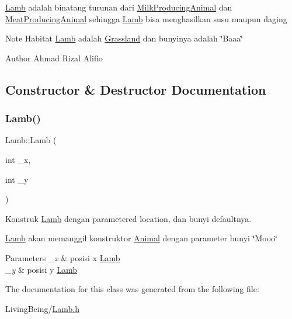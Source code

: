\mbox{\hyperlink{classLamb}{Lamb}} adalah binatang turunan dari \mbox{\hyperlink{classMilkProducingAnimal}{Milk\+Producing\+Animal}} dan \mbox{\hyperlink{classMeatProducingAnimal}{Meat\+Producing\+Animal}} sehingga \mbox{\hyperlink{classLamb}{Lamb}} bisa menghasilkan susu maupun daging

\begin{DoxyNote}{Note}
Habitat \mbox{\hyperlink{classLamb}{Lamb}} adalah \mbox{\hyperlink{classGrassland}{Grassland}} dan bunyinya adalah \char`\"{}\+Baaa\char`\"{}
\end{DoxyNote}
\begin{DoxyAuthor}{Author}
Ahmad Rizal Alifio 
\end{DoxyAuthor}


\subsection{Constructor \& Destructor Documentation}
\mbox{\label{classLamb_ab74133ef64cd43f3ea1127fb847488d4}} 
\subsubsection{\texorpdfstring{Lamb()}{Lamb()}}
{\footnotesize\ttfamily Lamb\+::\+Lamb (\begin{DoxyParamCaption}\item[{int}]{\+\_\+x,  }\item[{int}]{\+\_\+y }\end{DoxyParamCaption})}



Konstruk \mbox{\hyperlink{classLamb}{Lamb}} dengan parametered location, dan bunyi defaultnya. 

\mbox{\hyperlink{classLamb}{Lamb}} akan memanggil konstruktor \mbox{\hyperlink{classAnimal}{Animal}} dengan parameter bunyi \char`\"{}\+Mooo\char`\"{}


\begin{DoxyParams}{Parameters}
{\em \+\_\+x} & posisi x \mbox{\hyperlink{classLamb}{Lamb}} \\
\hline
{\em \+\_\+y} & posisi y \mbox{\hyperlink{classLamb}{Lamb}} \\
\hline
\end{DoxyParams}


The documentation for this class was generated from the following file\+:\begin{DoxyCompactItemize}
\item 
Living\+Being/\mbox{\hyperlink{Lamb_8h}{Lamb.\+h}}\end{DoxyCompactItemize}
